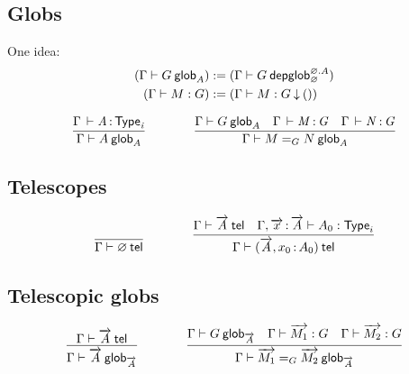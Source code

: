 
\subsection{Globs}


One idea:
\[\begin{aligned}
({\Gamma} \vdash {G} \: \mathsf{glob}_{A}) &:= ({\Gamma} \vdash {G} \: \mathsf{depglob}^{\varnothing.A}_{\varnothing}) \\
({\Gamma} \vdash {M} : {G}) &:= ({\Gamma} \vdash {M} : {G}\mathbin{\downarrow}{()})
\end{aligned}\]

\begin{small}
  \[
  \infer{\wfglob{\Gamma}{A}{A}}
  {\oftp{\Gamma}{A}{\typ{i}}}
  \qquad\qquad
  \infer{\wfglob{\Gamma}{\homj{G}{M}{N}}{A}}
  {\wfglob{\Gamma}{G}{A} &
    \oftp{\Gamma}{M}{G} &
    \oftp{\Gamma}{N}{G}
  }
  \]
\end{small}

\subsection{Telescopes}

\begin{small}
  \[
  \infer{\wftel{\Gamma}{\varnothing}}{}
  \qquad\qquad
  \infer
    {\wftel{\Gamma}{(\tel A,\tptm{x_0}{A_0})}}
    {\wftel{\Gamma}{\tel A}
    & \wftype{\Gamma,\teltm xA}{A_0}}
  \]
\end{small}

\subsection{Telescopic globs}

\begin{small}
  \[
  \infer
    {\wfglob{\Gamma}{\tel A}{\tel A}}
    {\wftel{\Gamma}{\tel A}}
  \qquad\qquad
  \infer
    {\wfglob{\Gamma}{\homj{G}{\tel{M_1}}{\tel{M_2}}}{\tel A}}
    {\wfglob{\Gamma}{G}{\tel A}
    & \ofglob{\Gamma}{\tel{M_1}}{G}
    & \ofglob{\Gamma}{\tel{M_2}}{G}}
  \]
\end{small}

